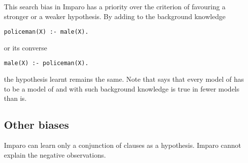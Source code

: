 This search bias in Imparo has a priority over the criterion of favouring a stronger or a weaker hypothesis. By adding to the background knowledge
\begin{lstlisting}
policeman(X) :- male(X).
\end{lstlisting}
or its converse
\begin{lstlisting}
male(X) :- policeman(X).
\end{lstlisting}
the hypothesis learnt remains the same.
Note that  says that every model of  has to be a model of  and with such background knowledge  is true in fewer models than  is.

\subsection{Other biases}
Imparo can learn only a conjunction of clauses as a hypothesis.
Imparo cannot explain the negative observations.
